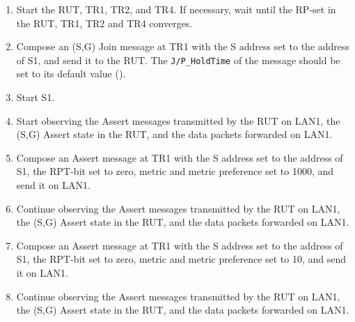 \documentclass[11pt]{report}
\begin{document}
\begin{enumerate}

  \item Start the RUT, TR1, TR2, and TR4. If necessary, wait until the RP-set
  in the RUT, TR1, TR2 and TR4 converges.

  \item Compose an (S,G) Join message at TR1 with the S address set to the
  address of S1, and send it to the RUT.
  The \verb=J/P_HoldTime= of the message should be set to its default
  value ({\PimsmJPHoldTime}).

  \item Start S1.

  \item Start observing the Assert messages transmitted by the RUT on
  LAN1, the (S,G) Assert state in the RUT, and the data packets forwarded on
  LAN1. 

  \item Compose an Assert message at TR1 with the S address set to the
  address of S1, the RPT-bit set to zero, metric and metric preference set to
  1000, and send it on LAN1.

  \item Continue observing the Assert messages transmitted by the RUT on
  LAN1, the (S,G) Assert state in the RUT, and the data packets forwarded on
  LAN1.

  \item Compose an Assert message at TR1 with the S address set to the
  address of S1, the RPT-bit set to zero, metric and metric preference set to
  10, and send it on LAN1.

  \item Continue observing the Assert messages transmitted by the RUT on
  LAN1, the (S,G) Assert state in the RUT, and the data packets forwarded on
  LAN1.

\end{enumerate}

\end{document}
